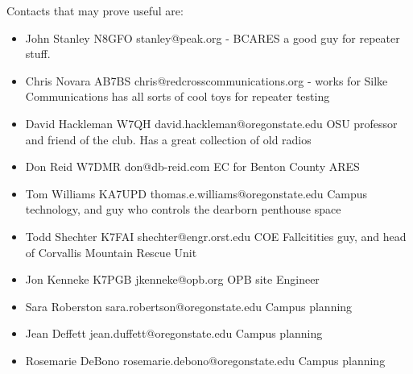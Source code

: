 \documentclass[10pt,letterpaper]{article}
\begin{document}
Contacts that may prove useful are:
\begin{itemize}
	\item John Stanley N8GFO stanley@peak.org - BCARES a good guy for repeater stuff.
	\item Chris Novara AB7BS chris@redcrosscommunications.org - works for Silke Communications has all sorts of cool toys for repeater testing
	\item David Hackleman W7QH david.hackleman@oregonstate.edu OSU professor and friend of the club. Has a great collection of old radios
	\item Don Reid W7DMR don@db-reid.com EC for Benton County ARES
	\item Tom Williams KA7UPD thomas.e.williams@oregonstate.edu Campus technology, and guy who controls the dearborn penthouse space
	\item Todd Shechter K7FAI shechter@engr.orst.edu COE Fallcitities guy, and head of Corvallis Mountain Rescue Unit
	\item Jon Kenneke K7PGB jkenneke@opb.org OPB site Engineer
	\item Sara Roberston sara.robertson@oregonstate.edu Campus planning
	\item Jean Deffett jean.duffett@oregonstate.edu Campus planning
	\item Rosemarie DeBono rosemarie.debono@oregonstate.edu Campus planning
\end{itemize}
\end{document}
